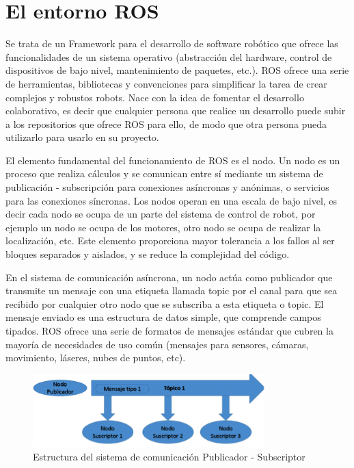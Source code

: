 \section{El entorno ROS}
Se trata de un Framework para el desarrollo de software robótico que ofrece las funcionalidades de un sistema operativo (abstracción del hardware, control de dispositivos de bajo nivel, mantenimiento de paquetes, etc.). ROS ofrece una serie de herramientas, bibliotecas y convenciones para simplificar la tarea de crear complejos y robustos robots. Nace con la idea de fomentar el desarrollo colaborativo, es decir que cualquier persona que realice un desarrollo puede subir a los repositorios que ofrece ROS para ello, de modo que otra persona pueda utilizarlo para usarlo en su proyecto.

El elemento fundamental del funcionamiento de ROS es el nodo. Un nodo es un proceso que realiza cálculos y se comunican entre sí mediante un sistema de publicación - subscripción para conexiones asíncronas y anónimas, o servicios para las conexiones síncronas. Los nodos operan en una escala de bajo nivel, es decir cada nodo se ocupa de un parte del sistema de control de robot, por ejemplo un nodo se ocupa de los motores, otro nodo se ocupa de realizar la localización, etc. Este elemento proporciona mayor tolerancia a los fallos al ser bloques separados y aislados, y se reduce la complejidad del código.

En el sistema de comunicación asíncrona, un nodo actúa como publicador que transmite un mensaje con una etiqueta llamada topic por el canal para que sea recibido por cualquier otro nodo que se subscriba a esta etiqueta o topic. El mensaje enviado es una estructura de datos simple, que comprende campos tipados. ROS ofrece una serie de formatos de mensajes estándar que cubren la mayoría de necesidades de uso común (mensajes para sensores, cámaras, movimiento, láseres, nubes de puntos, etc).

\begin{figure}[H]
  \begin{center}
    \includegraphics[width=0.8\textwidth]{figures/publicadorsubscriptor.png}
		\caption{Estructura del sistema de comunicación Publicador - Subscriptor}
		\label{fig.publicadorsubscriptor}
		\end{center}
\end{figure}

